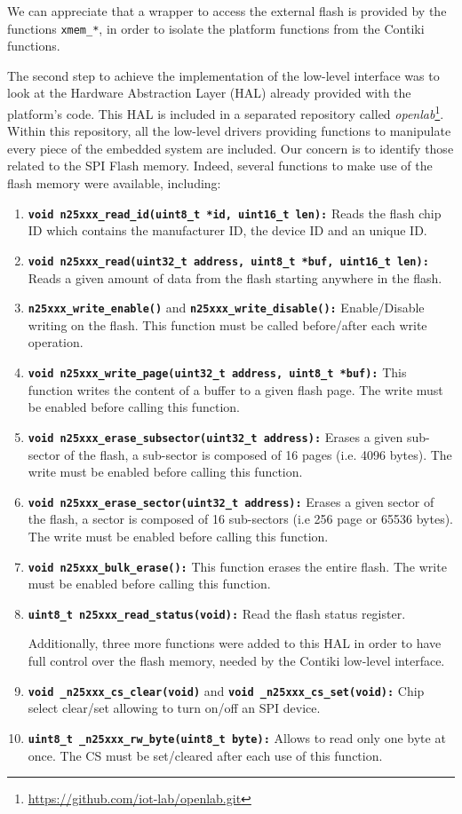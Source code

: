 We can appreciate that a wrapper to access the external flash is provided by the functions \texttt{xmem\_*}, in order to isolate the platform functions from the Contiki functions.

The second step to achieve the implementation of the low-level interface was to look at the Hardware Abstraction Layer (HAL) already provided with the platform's code.
This HAL is included in a separated repository called \textit{openlab}\footnote{\url{https://github.com/iot-lab/openlab.git}}.
Within this repository, all the low-level drivers providing functions to manipulate every piece of the embedded system are included.
Our concern is to identify those related to the SPI Flash memory.
Indeed, several functions to make use of the flash memory were available, including:
\begin{enumerate}
	\item \texttt{\textbf{void n25xxx\_read\_id(uint8\_t *id, uint16\_t len):}} Reads the flash chip ID which contains the manufacturer ID, the device ID and an unique ID.
	\item \texttt{\textbf{void n25xxx\_read(uint32\_t address, uint8\_t *buf, uint16\_t len):}} Reads a given amount of data from the flash starting anywhere in the flash.
	\item \texttt{\textbf{n25xxx\_write\_enable()}} and \texttt{\textbf{n25xxx\_write\_disable():}} Enable/Disable writing on the flash.
	This function must be called before/after each write operation.
	\item \texttt{\textbf{void n25xxx\_write\_page(uint32\_t address, uint8\_t *buf):}} This function writes the content of a buffer to a given flash page.
	The write must be enabled before calling this function.
	\item \texttt{\textbf{void n25xxx\_erase\_subsector(uint32\_t address):}} Erases a given sub-sector of the flash, a sub-sector is composed of 16 pages (i.e. 4096 bytes).
	The write must be enabled before calling this function.
	\item \texttt{\textbf{void n25xxx\_erase\_sector(uint32\_t address):}} Erases a given sector of the flash, a sector is composed of 16 sub-sectors (i.e 256 page or 65536 bytes).
	The write must be enabled before calling this function.
	\item \texttt{\textbf{void n25xxx\_bulk\_erase():}} This function erases the entire flash.
	The write must be enabled before calling this function.
	\item \texttt{\textbf{uint8\_t n25xxx\_read\_status(void):}} Read the flash status register.
	
	Additionally, three more functions were added to this HAL in order to have full control over the flash memory, needed by the Contiki low-level interface.
	
	\item \texttt{\textbf{void \_n25xxx\_cs\_clear(void)}} and \texttt{\textbf{void \_n25xxx\_cs\_set(void):}} Chip select clear/set allowing to turn on/off an SPI device.
	\item \texttt{\textbf{uint8\_t \_n25xxx\_rw\_byte(uint8\_t byte):}} Allows to read only one byte at once.
	The CS must be set/cleared after each use of this function.
\end{enumerate}
